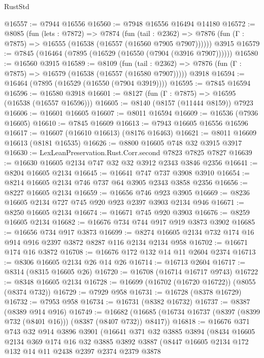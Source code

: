 \begin{lexlean}{RustStd}
\begin{coremodule}
@16557 := @7944 @16556
@16560 := @7948 @16556 @16494 @14180
@16572 := @8085
    (fun (lets : @7872) =>
    @7874
      (fun (tail : @2362) =>
      @7876 (fun (Γ : @7875) => @16555 (@16538 (@16557 (@16560 @7905 @7907))))))
    @3915
@16579 := @7845 (@16464 (@7895 (@16529 (@16550 (@7904 (@3916 @7907))))))
@16580 := @16560 @3915
@16589 := @8109
    (fun (tail : @2362) => @7876 (fun (Γ : @7875) => @16579 (@16538 (@16557 (@16580 @7907)))))
    @3918
@16594 := @16464 (@7895 (@16529 (@16550 (@7904 @3919))))
@16595 := @7845 @16594
@16596 := @16580 @3918
@16601 := @8127 (fun (Γ : @7875) => @16595 (@16538 (@16557 @16596)))
@16605 := @8140 (@8157 (@11444 @8159)) @7923
@16606 := @16601 @16605
@16607 := @8011 @16594
@16609 := @16536 (@7936 @16605)
@16610 := @7845 @16609
@16613 := @7943 @16605 @16556 @16596
@16617 := @16607 (@16610 @16613) (@8176 @16463)
@16621 := @8011 @16609 @16613 (@8181 @16535)
@16626 := @8800 @16605 @748 @32 @3915 @3917
@16630 := LexLeanPreservation.Rust.Corr.second @7823 @7825 @7827
@16639 := @16630 @16605 @2134 @747 @32 @32 @3912 @2343 @3846 @2356
@16641 := @8204 @16605 @2134
@16645 := @16641 @747 @737 @3908 @3910
@16654 := @8214 @16605 @2134 @746 @737 @64 @3905 @2343 @3858 @2356
@16656 := @8227 @16605 @2134
@16659 := @16656 @746 @923 @3905
@16669 := @8236 @16605 @2134 @727 @745 @920 @923 @2397 @3903 @2134 @946
@16671 := @8250 @16605 @2134
@16674 := @16671 @745 @920 @3903
@16676 := @8259 @16605 @2134
@16682 := @16676 @734 @744 @917 @919 @3873 @3902
@16685 := @16656 @734 @917 @3873
@16699 := @8274 @16605 @2134 @732 @174 @16 @914 @916 @2397 @3872 @8287 @116 @2134 @2134 @958
@16702 := @16671 @174 @16 @3872
@16708 := @16676 @172 @132 @14 @11 @2604 @2374
@16713 := @8306 @16605 @2134 @26 @14 @26
@16714 := @16713 @2604
@16717 := @8314 (@8315 @16605 @26)
@16720 := @16708 (@16714 @16717 @9743)
@16722 := @8348 @16605 @2134
@16728 := @16699 (@16702 (@16720 @16722)) (@8055 (@8374 @732))
@16729 := @7929 @958
@16731 := @16728 (@8378 @16729)
@16732 := @7953 @958
@16734 := @16731 (@8382 @16732)
@16737 := @8387 (@8389 @914 @916)
@16749 := @16682
    (@16685 (@16734 @16737 (@8397 (@8399 @732 (@8401 @16))) (@8387 (@8407 @732)) @8417))
@16818 := @16676
    @371
    @743
    @32
    @914
    @3896
    @3901
    (@16641
      @371
      @32
      @3885
      @3894
      (@8434
        @16605
        @2134
        @369
        @174
        @16
        @32
        @3885
        @3892
        @3887
        (@8447
          @16605
          @2134
          @172
          @132
          @14
          @11
          @2438
          @2397
          @2374
          @2379
          @3878

\end{coremodule}
\end{lexlean}

